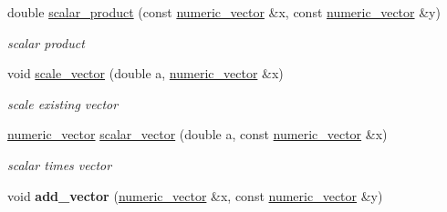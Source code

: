 \begin{DoxyCompactItemize}
\item 
\hypertarget{namespacenatrium_1_1Math_a60a79394533003516ee1895b0cb93c73}{
double \hyperlink{namespacenatrium_1_1Math_a60a79394533003516ee1895b0cb93c73}{scalar\_\-product} (const \hyperlink{namespacenatrium_a67c39077adc6634f8fa3762b8eef24c4}{numeric\_\-vector} \&x, const \hyperlink{namespacenatrium_a67c39077adc6634f8fa3762b8eef24c4}{numeric\_\-vector} \&y)}
\label{namespacenatrium_1_1Math_a60a79394533003516ee1895b0cb93c73}

\begin{DoxyCompactList}\small\item\em scalar product \item\end{DoxyCompactList}\item 
\hypertarget{namespacenatrium_1_1Math_a951fe967a78de6add632ac1944465bf3}{
void \hyperlink{namespacenatrium_1_1Math_a951fe967a78de6add632ac1944465bf3}{scale\_\-vector} (double a, \hyperlink{namespacenatrium_a67c39077adc6634f8fa3762b8eef24c4}{numeric\_\-vector} \&x)}
\label{namespacenatrium_1_1Math_a951fe967a78de6add632ac1944465bf3}

\begin{DoxyCompactList}\small\item\em scale existing vector \item\end{DoxyCompactList}\item 
\hypertarget{namespacenatrium_1_1Math_af6c85a423e8c6ec87858a3d48669a271}{
\hyperlink{namespacenatrium_a67c39077adc6634f8fa3762b8eef24c4}{numeric\_\-vector} \hyperlink{namespacenatrium_1_1Math_af6c85a423e8c6ec87858a3d48669a271}{scalar\_\-vector} (double a, const \hyperlink{namespacenatrium_a67c39077adc6634f8fa3762b8eef24c4}{numeric\_\-vector} \&x)}
\label{namespacenatrium_1_1Math_af6c85a423e8c6ec87858a3d48669a271}

\begin{DoxyCompactList}\small\item\em scalar times vector \item\end{DoxyCompactList}\item 
\hypertarget{namespacenatrium_1_1Math_adce2097ce0c14661aac3eaff3a03e183}{
void {\bfseries add\_\-vector} (\hyperlink{namespacenatrium_a67c39077adc6634f8fa3762b8eef24c4}{numeric\_\-vector} \&x, const \hyperlink{namespacenatrium_a67c39077adc6634f8fa3762b8eef24c4}{numeric\_\-vector} \&y)}
\label{namespacenatrium_1_1Math_adce2097ce0c14661aac3eaff3a03e183}


\end{DoxyCompactItemize}
